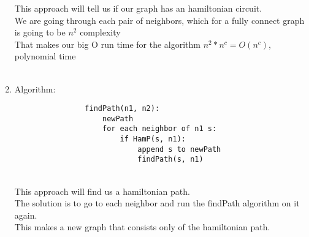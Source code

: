 \documentclass[11pt]{article}
\begin{document}
\begin{enumerate}
                    This approach will tell us if our graph has an hamiltonian circuit. \\
                    We are going through each pair of neighbors, which for a fully connect graph is going to be $n^2$ complexity\\
                    That makes our big O run time for the algorithm $n^2 * n^c = O(n^c)$, polynomial time\\
                    \\
                \item
                    Algorithm:
                    \begin{verbatim}
                findPath(n1, n2):
                    newPath
                    for each neighbor of n1 s:
                        if HamP(s, n1):
                            append s to newPath
                            findPath(s, n1)
               \end{verbatim}\\

               This approach will find us a hamiltonian path.\\
               The solution is to go to each neighbor and run the findPath algorithm on it again. \\
               This makes a new graph that consists only of the hamiltonian path.\\

       \end{enumerate}

       
\end{document}
